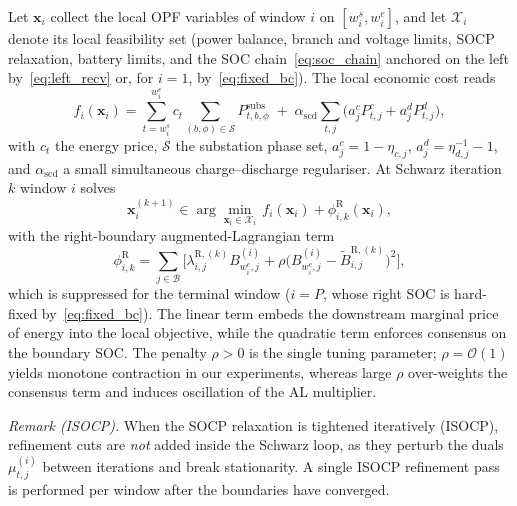 Let $\bm{x}_{i}$ collect the local OPF variables of window $i$ on
$[w^{s}_{i},w^{e}_{i}]$, and let $\mathcal{X}_{i}$ denote its local
feasibility set (power balance, branch and voltage limits, SOCP
relaxation, battery limits, and the SOC chain~\eqref{eq:soc_chain}
anchored on the left by~\eqref{eq:left_recv} or, for $i\!=\!1$,
by~\eqref{eq:fixed_bc}). The local economic cost reads
\begin{equation}
\label{eq:local_cost}
f_{i}(\bm{x}_{i}) = \!\!\sum_{t=w^{s}_{i}}^{w^{e}_{i}}\!\!
   c_{t}\!\!\!\sum_{(b,\phi)\in\mathcal{S}}\!\!\! P^{\mathrm{subs}}_{t,b,\phi}
 \;+\; \alpha_{\mathrm{scd}}\!\!\sum_{t,j}\!
   \big(a^{c}_{j}P^{c}_{t,j}+a^{d}_{j}P^{d}_{t,j}\big),
\end{equation}
with $c_{t}$ the energy price, $\mathcal{S}$ the substation phase set,
$a^{c}_{j}\!=\!1\!-\!\eta_{c,j}$, $a^{d}_{j}\!=\!\eta_{d,j}^{-1}\!-\!1$,
and $\alpha_{\mathrm{scd}}$ a small simultaneous charge--discharge
regulariser. At Schwarz iteration $k$ window $i$ solves
\begin{equation}
\label{eq:otd_sub}
\bm{x}_{i}^{(k+1)} \in
\arg\!\min_{\bm{x}_{i}\in\mathcal{X}_{i}}\,
f_{i}(\bm{x}_{i}) + \phi^{\mathrm{R}}_{i,k}(\bm{x}_{i}),
\end{equation}
with the right-boundary augmented-Lagrangian term
\begin{equation}
\label{eq:al_term}
\phi^{\mathrm{R}}_{i,k} \!=\! \sum_{j\in\mathcal{B}}\!
\Big[\lambda^{\mathrm{R},(k)}_{i,j} B^{(i)}_{w^{e}_{i},j}
\!+\!\rho\big(B^{(i)}_{w^{e}_{i},j}\!-\!\widetilde{B}^{\mathrm{R},(k)}_{i,j}\big)^{\!2}\Big],
\end{equation}
which is suppressed for the terminal window ($i\!=\!P$, whose right SOC
is hard-fixed by~\eqref{eq:fixed_bc}). The linear term embeds the
downstream marginal price of energy into the local objective, while the
quadratic term enforces consensus on the boundary SOC. The penalty
$\rho\!>\!0$ is the single tuning parameter; $\rho\!=\!\mathcal{O}(1)$
yields monotone contraction in our experiments, whereas large $\rho$
over-weights the consensus term and induces oscillation of the AL
multiplier.

\emph{Remark (ISOCP).} When the SOCP relaxation is tightened iteratively
(ISOCP), refinement cuts are \emph{not} added inside the Schwarz loop,
as they perturb the duals $\mu^{(i)}_{t,j}$ between iterations and break
stationarity. A single ISOCP refinement pass is performed per window
after the boundaries have converged.

